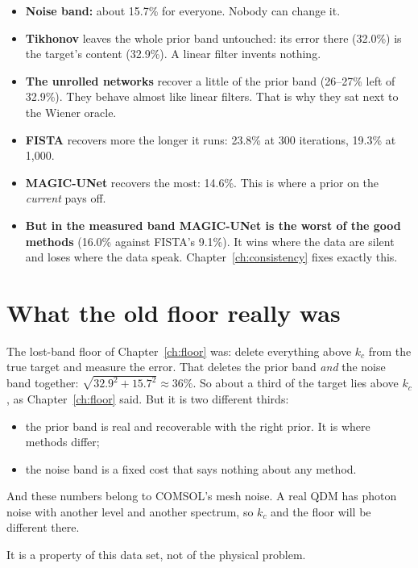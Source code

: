 \begin{keyidea}
\begin{itemize}
\item \textbf{Noise band:} about 15.7\% for everyone. Nobody can change it.
\item \textbf{Tikhonov} leaves the whole prior band untouched: its error there (32.0\%) is the target's content (32.9\%).
A linear filter invents nothing.
\item \textbf{The unrolled networks} recover a little of the prior band (26--27\% left of 32.9\%). They behave almost like
linear filters. That is why they sat next to the Wiener oracle.
\item \textbf{FISTA} recovers more the longer it runs: 23.8\% at 300 iterations, 19.3\% at 1{,}000.
\item \textbf{MAGIC-UNet} recovers the most: 14.6\%. This is where a prior on the \emph{current} pays off.
\item \textbf{But in the measured band MAGIC-UNet is the worst of the good methods} (16.0\% against FISTA's 9.1\%). It wins
where the data are silent and loses where the data speak. Chapter~\ref{ch:consistency} fixes exactly this.
\end{itemize}
\end{keyidea}

\section{What the old floor really was}

The lost-band floor of Chapter~\ref{ch:floor} was: delete everything above $k_c$ from the true target and measure the
error. That deletes the prior band \emph{and} the noise band together: $\sqrt{32.9^2+15.7^2}\approx36\%$. So about a third
of the target lies above $k_c$, as Chapter~\ref{ch:floor} said. But it is two different thirds:
\begin{itemize}
\item the prior band is real and recoverable with the right prior. It is where methods differ;
\item the noise band is a fixed cost that says nothing about any method.
\end{itemize}
And these numbers belong to COMSOL's mesh noise. A real QDM has photon noise with another level and another spectrum,
so $k_c$ and the floor will be different there.

\begin{careful}
It is a property of this data set, not of the physical problem.
\end{careful}

